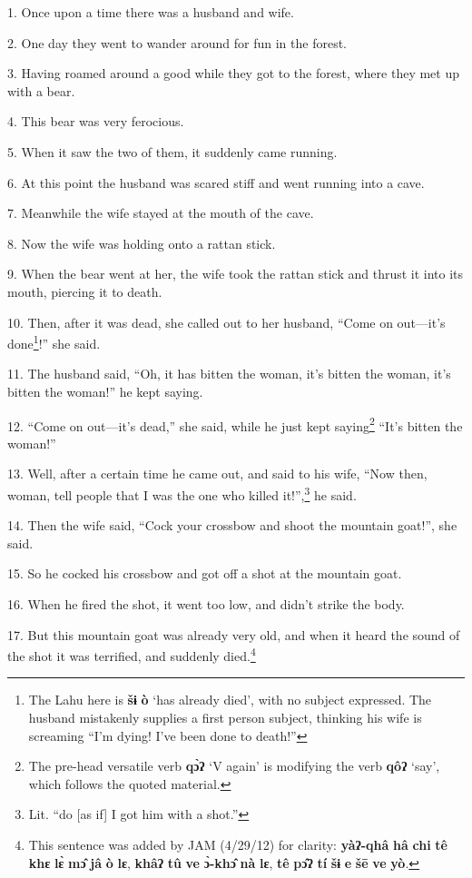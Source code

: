\setcounter{footnote}{0}

1. Once upon a time there was a husband and wife.

2. One day they went to wander around for fun in the forest.

3. Having roamed around a good while they got to the forest, where they met up
with a bear.

4. This bear was very ferocious.

5. When it saw the two of them, it suddenly came running.

6. At this point the husband was scared stiff and went running into a cave.

7. Meanwhile the wife stayed at the mouth of the cave.

8. Now the wife was holding onto a rattan stick.

9. When the bear went at her, the wife took the rattan stick and thrust it into
its mouth, piercing it to death.

10. Then, after it was dead, she called out to her husband, ``Come on out---it's
done\footnote{The Lahu here is \textbf{šɨ} \textbf{ò} `has already died', with no subject expressed. The husband mistakenly supplies a first person subject, thinking his wife is screaming ``I'm dying! I've been done to death!''}!'' she said.

11. The husband said, ``Oh, it has bitten the woman, it's bitten the woman, it's
bitten the woman!'' he kept saying.

12. ``Come on out---it's dead,'' she said, while he just kept saying\footnote{The pre-head versatile verb \textbf{qɔ̀ʔ} `V again' is modifying the verb \textbf{qôʔ} `say', which follows the quoted material.} ``It's
bitten the woman!''

13. Well, after a certain time he came out, and said to his wife, ``Now then, woman,
tell people that I was the one who killed it!'',\footnote{Lit. ``do [as if] I got him with a shot.''} he said.

14. Then the wife said, ``Cock your crossbow and shoot the mountain goat!'', she
said.

15. So he cocked his crossbow and got off a shot at the mountain goat.

16. When he fired the shot, it went too low, and didn't strike the body.

17. But this mountain goat was already very old, and when it heard the sound of
the shot it was terrified, and suddenly died.\footnote{This sentence was added by JAM (4/29/12) for clarity: \textbf{yàʔ-qhâ} \textbf{hâ} \textbf{chi} \textbf{tê} \textbf{khɛ} \textbf{lɛ̀} \textbf{mɔ̂} \textbf{jâ} \textbf{ò} \textbf{lɛ}, \textbf{khâʔ} \textbf{tû} \textbf{ve} \textbf{ɔ̀-khɔ̂} \textbf{nà} \textbf{lɛ}, \textbf{tê} \textbf{pɔ̂ʔ} \textbf{tí} \textbf{šɨ} \textbf{e} \textbf{šē} \textbf{ve} \textbf{yò}.}

